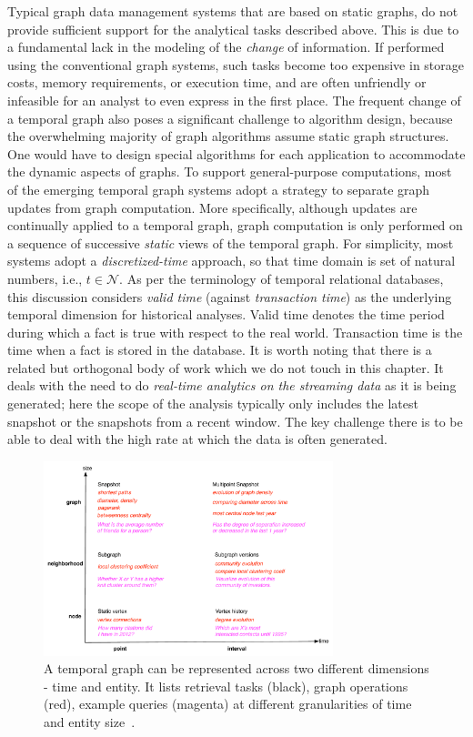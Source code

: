 \documentclass{svjour3}
\begin{document}
Typical graph data management systems that are based on static graphs, do not provide sufficient support for the analytical tasks described above. This is due to a fundamental lack in the modeling of the {\em change} of information. If performed using the conventional graph systems, such tasks become too expensive in storage costs, memory requirements, or execution time, and are often unfriendly or infeasible for an analyst to even express in the first place. 
The frequent change of a temporal graph also poses a significant challenge to algorithm design, because the overwhelming majority of graph algorithms assume static graph structures. One would have to design special algorithms for each application to accommodate the dynamic aspects of graphs. To support general-purpose computations, most of the emerging temporal graph systems adopt a strategy to separate graph updates from graph computation. More specifically, although updates are continually applied to a temporal graph, graph computation is only performed on a sequence of successive \emph{static} views of the temporal graph. For simplicity, most systems adopt a \emph{discretized-time} approach, so that time domain is set of natural numbers, i.e., $t\in \mathcal{N}$. 
As per the terminology of temporal relational databases, this discussion considers {\em valid time} (against {\em transaction time}) as the underlying temporal dimension for historical analyses. Valid time denotes the time
period during which a fact is true with respect to the real world. Transaction time is the time
when a fact is stored in the database. 
It is worth noting that there is a related but orthogonal body of work which we do not touch in this chapter. It deals with the need to do {\em real-time analytics on the streaming data} as it is being generated; here the scope of the analysis typically only includes the latest snapshot or the snapshots from a recent window. The key challenge there is to be able to deal with the high rate at which the data is often generated.

\begin{figure}
\centering
\includegraphics [width=0.75\textwidth]{entity-time.pdf}
\caption{A temporal graph can be represented across two different dimensions - time
and entity. It lists retrieval tasks (black), graph operations (red), example queries
(magenta) at different granularities of time and entity size~\cite{khurana2015historical}.}
\label{fig:et}
\end{figure}
\end{document}
